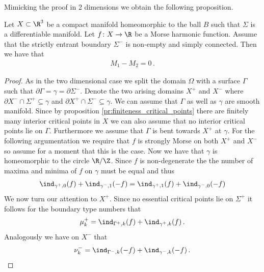 Mimicking the proof in 2 dimensions we obtain the following proposition.
\begin{proposition}
  Let $X\subset\R^3$ be a compact manifold homeomorphic to the ball $B$ such that $\Sigma$ is a differentiable manifold.
  Let $f\colon X\to\R$ be a Morse harmonic function. Assume that the strictly entrant boundary $\Sigma^-$ is non-empty and simply connected.
  Then we have that
  \begin{align*}
    M_1-M_2=0\,.
  \end{align*}
\end{proposition}
\begin{proof}
  As in the two dimensional case we split the domain $\Omega$ with a surface $\Gamma$ such that
  $\partial\Gamma=\gamma=\partial\Sigma^-$.
  Denote the two arising domains $X^+$ and $X^-$ where $\partial X^-\cap\Sigma^+\subseteq\gamma$ and
  $\partial X^+\cap \Sigma^-\subseteq\gamma$.
  We can assume that $\Gamma$ as well as $\gamma$ are smooth manifold.
  Since by proposition \ref{pr:finiteness_critical_points} there are finitely many interior critical points in $X$
  we can also assume that no interior critical points lie on $\Gamma$.
  Furthermore we assume that $\Gamma$ is bent towards $X^+$ at $\gamma$.
  For the following argumentation we require that $f$ is strongly Morse on both $X^+$ and
  $X^-$ so assume for a moment that this is the case.
  Now we have that $\gamma$ is homeomorphic to the circle $\R/\Z$.
  Since $f$ is non-degenerate the
  the number of maxima and minima of $f$ on $\gamma$ must be equal and thus
  \begin{align}
    \ind_{\gamma^+,0}(f)+\ind_{\gamma^-,1}(-f)=\ind_{\gamma^+,1}(f)+\ind_{\gamma^-,0}(-f)
    \label{eq:n3_disproof_morse_maxMinRel}
  \end{align}
  We now turn our attention to $X^+$. Since no essential critical points lie on $\Sigma^+$ 
  it follows for the boundary type numbers that
  \begin{align}
    \mu^+_k=\ind_{\Gamma^+,k}(f)+\ind_{\gamma^+,k}(f)\,.\label{eq:n3_disproof_morse_muplus}
  \end{align}
  Analogously we have on $X^-$ that
  \begin{align}
    \nu^-_k=\ind_{\Gamma^-,k}(-f)+\ind_{\gamma^-,k}(-f)\,.\label{eq:n3_disproof_morse_numinus}

\end{align}
\end{proof}
